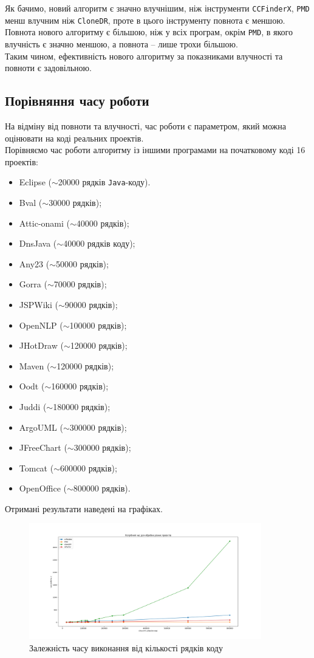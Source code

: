 \documentclass[a4paper, 14pt]{article}
\begin{document}
Як бачимо, новий алгоритм є значно влучнішим, ніж інструменти \verb|CCFinderX|, \verb|PMD| менш влучним ніж \verb|CloneDR|, проте в цього інструменту повнота є меншою. \\
Повнота нового алгоритму є більшою, ніж у всіх програм, окрім \verb|PMD|, в якого влучність є значно меншою, а повнота -- лише трохи більшою. \\
Таким чином, ефективність нового алгоритму за показниками влучності та повноти є задовільною.
\subsection{Порівняння часу роботи}
На відміну від повноти та влучності, час роботи є параметром, який можна оцінювати на коді реальних проектів. \\
Порівняємо час роботи алгоритму із іншими програмами на початковому коді 16 проектів:
\begin{itemize}
\item Eclipse ($\sim$20000 рядків \verb|Java|-коду).
\item Bval ($\sim$30000 рядків);
\item Attic-onami ($\sim$40000 рядків);
\item DnsJava ($\sim$40000 рядків коду);
\item Any23 ($\sim$50000 рядків);
\item Gorra ($\sim$70000 рядків);
\item JSPWiki ($\sim$90000 рядків);
\item OpenNLP ($\sim$100000 рядків);
\item JHotDraw ($\sim$120000 рядків);
\item Maven ($\sim$120000 рядків);
\item Oodt ($\sim$160000 рядків);
\item Juddi ($\sim$180000 рядків);
\item ArgoUML ($\sim$300000 рядків);
\item JFreeChart ($\sim$300000 рядків);
\item Tomcat ($\sim$600000 рядків);
\item OpenOffice ($\sim$800000 рядків).
\end{itemize}
Отримані результати наведені на графіках. \\ \newpage
\begin{figure}[h]
    \centering
    \includegraphics[width=0.9\textwidth]{graph1}
		\caption{Залежність часу виконання від кількості рядків коду}
\end{figure} \hfill \\
\end{document}
